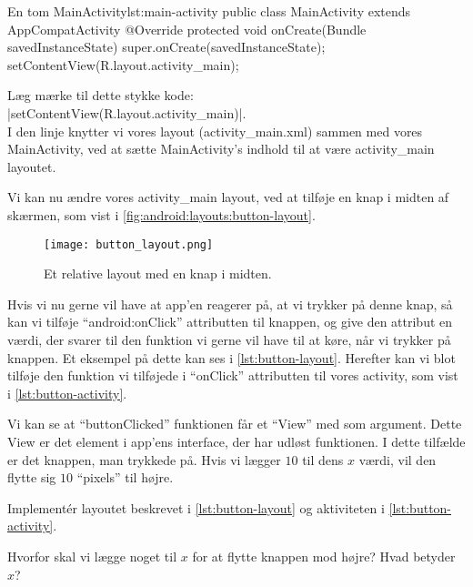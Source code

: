\begin{JavaCode}{En tom MainActivity}{lst:main-activity}
	public class MainActivity extends AppCompatActivity {
		@Override
		protected void onCreate(Bundle savedInstanceState) {
			super.onCreate(savedInstanceState);
			setContentView(R.layout.activity_main);
		}
	}
\end{JavaCode}

\noindent
Læg mærke til dette stykke kode: \\
\JavaInline|setContentView(R.layout.activity_main)|. \\
I den linje knytter vi vores layout (activity\_main.xml) sammen med vores MainActivity, ved at sætte MainActivity's indhold til at være activity\_main layoutet.

Vi kan nu ændre vores activity\_main layout, ved at tilføje en knap i midten af skærmen, som vist i \autoref{fig:android:layouts:button-layout}.

\begin{figure}[h]
	\begin{center}
		\texttt{[image: button\_layout.png]}
		\caption{Et relative layout med en knap i midten.}
		\label{fig:android:layouts:button-layout}
	\end{center}
\end{figure}

Hvis vi nu gerne vil have at app'en reagerer på, at vi trykker på denne knap, så 
kan vi tilføje ``android:onClick'' attributten til knappen, og give den attribut 
en værdi, der svarer til den funktion vi gerne vil have til at køre, når vi 
trykker på knappen. Et eksempel på dette kan ses i \autoref{lst:button-layout}.
Herefter kan vi blot tilføje den funktion vi tilføjede i ``onClick'' 
attributten til vores activity, som vist i \autoref{lst:button-activity}.

Vi kan se at ``buttonClicked'' funktionen får et ``View'' med som argument. 
Dette View er det element i app'ens \gls{interface}, der har udløst funktionen. 
I dette tilfælde er det knappen, man trykkede på. Hvis vi lægger $10$ til dens 
$x$ værdi, vil den flytte sig $10$ ``pixels'' til højre.

\begin{exercise}
	Implementér layoutet beskrevet i \autoref{lst:button-layout} og aktiviteten 
	i \autoref{lst:button-activity}.
\end{exercise}

\begin{exercise}
	Hvorfor skal vi lægge noget til $x$ for at flytte knappen mod højre? Hvad 
	betyder $x$?
\end{exercise}

